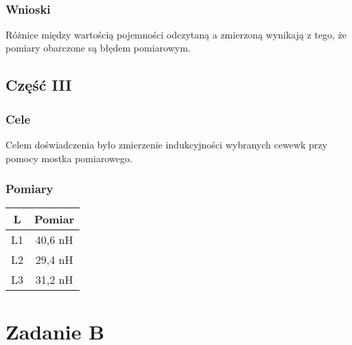 \documentclass{article}
\begin{document}
\\
\subsubsection{Wnioski}
Różnice między wartością pojemności  odczytaną a zmierzoną wynikają z tego, że pomiary obarczone są błędem pomiarowym.\\
\subsection{Część III}
\subsubsection{Cele}
Celem doświadczenia było zmierzenie indukcyjności wybranych cewewk przy pomocy mostka pomiarowego.\\
\subsubsection{Pomiary}
\begin{tabular}{|c|c|}
\hline
L & Pomiar \\
\hline
L1 & 40,6 nH \\
\hline
L2 &29,4 nH \\
\hline
L3 & 31,2 nH \\
\hline
\end{tabular}

\section{Zadanie B}
\end{document}
